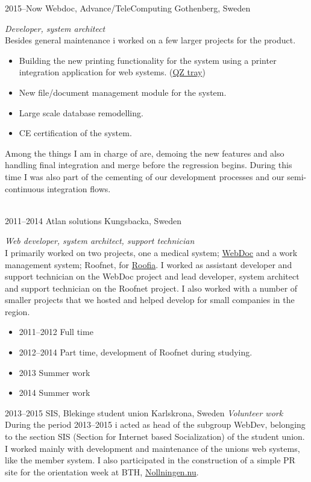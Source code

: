 \documentclass[]{friggeri-cv} %
\begin{document}
\begin{entrylist}
\entry
{2015--Now}
{Webdoc, Advance/TeleComputing}
{Gothenberg, Sweden}
{\emph{Developer, system architect} \\
Besides general maintenance i worked on a few larger projects for the product.
\begin{itemize}
\item Building the new printing functionality for the system using a printer integration application for web systems. (\href{http://qz.io}{QZ tray})
\item New file/document management module for the system.
\item Large scale database remodelling.
\item CE certification of the system.
\end{itemize}

Among the things I am in charge of are, demoing the new features and also handling final integration and merge before the regression begins. 
During this time I was also part of the cementing of our development processes and our semi-continuous integration flows.\\

}\\
\entry
{2011--2014}
{Atlan solutions}
{Kungsbacka, Sweden}
{\emph{Web developer, system architect, support technician} \\
I primarily worked on two projects, one a medical system; \href{http://atlan.se/}{WebDoc} and a work management system; Roofnet, for \href{http://www.roofia.se/}{Roofia}. I worked as assistant developer and support technician on the WebDoc project and lead developer, system architect and support technician on the Roofnet project. I also worked with a number of smaller projects that we hosted and helped develop for small companies in the region. \\
\begin{itemize}
	\item 2011--2012 Full time
	\item 2012--2014 Part time, development of Roofnet during studying.
	\item 2013 Summer work
	\item 2014 Summer work
\end{itemize}
}
\entry
{2013--2015}
{SIS, Blekinge student union}
{Karlskrona, Sweden}
{\emph{Volunteer work} \\
During the period 2013--2015 i acted as head of the subgroup WebDev, belonging to the section SIS (Section for Internet based Socialization) of the student union. I worked mainly with development and maintenance of the unions web systems, like the member system. I also participated in the construction of a simple PR site for the orientation week at BTH, \href{http://www.nollningen.nu}{Nollningen.nu}. }
\end{entrylist}
\newpage
\end{document}
